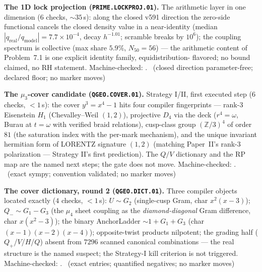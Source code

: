 \documentclass[11pt,a4paper]{article}
\theoremstyle{definition}
\begin{document}
\par\smallskip\noindent\textbf{The 1D lock projection
(\texttt{PRIME.LOCKPROJ.01}).}
The arithmetic layer in one dimension ($6$ checks, ${\sim}35$\,s):
along the closed v591 direction the zero-side functional cancels the
closed density value in a near-identity (median
$|q_{\mathrm{real}}/q_{\mathrm{model}}|=7.7\times10^{-4}$, decay
$h^{-1.01}$; scramble breaks by $10^6$); the coupling spectrum is
collective (max share $5.9\%$, $N_{50}=56$) --- the arithmetic content
of Problem~7.1 is one explicit identity family, equidistribution-
flavored; no bound claimed, no RH statement. Machine-checked:
.
\mE\ (closed direction parameter-free; declared floor; no marker
moves)
\par\smallskip

\par\smallskip\noindent\textbf{The $\mu_3$-cover candidate
(\texttt{QGEO.COVER.01}).}
Strategy I/II, first executed step ($6$ checks, $<1$\,s): the cover
$y^3=x^4-1$ hits four compiler fingerprints --- rank-3 Eisenstein
$H_1$ (Chevalley--Weil $(1,2)$), projective $D_4$ via the deck
($r^4=\omega$, Burau at $t=\omega$ with verified braid relations),
cusp-class group $(\mathbb{Z}/3)^4$ of order $81$ (the saturation
index with the per-mark mechanism), and the unique invariant hermitian
form of LORENTZ signature $(1,2)$ (matching Paper~II's rank-3
polarization --- Strategy II's first prediction).  The $Q/V$
dictionary and the RP map are the named next steps; the gate does not
move. Machine-checked: .
\mE\ (exact sympy; convention validated; no marker moves)
\par\smallskip

\par\smallskip\noindent\textbf{The cover dictionary, round 2
(\texttt{QGEO.DICT.01}).}
Three compiler objects located exactly ($4$ checks, $<1$\,s):
$U\sim G_2$ (single-cusp Gram, char $x^2(x-3)$); $Q_-\sim G_1-G_3$
(the $\mu_4$ sheet coupling as the \emph{diamond-diagonal} Gram
difference, char $x(x^2-3)$); the binary AnchorLadder
$\sim1+G_1+G_3$ (char $(x-1)(x-2)(x-4)$); opposite-twist products
nilpotent; the grading half ($Q_+$/$V$/$H$/$Q$) absent from $7296$
scanned canonical combinations --- the real structure is the named
suspect; the Strategy-I kill criterion is not triggered.
Machine-checked: .
\mE\ (exact entries; quantified negatives; no marker moves)
\par\smallskip
\end{document}
